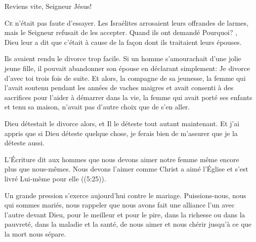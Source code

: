 Reviens vite, Seigneur Jésus! 

\dvrule








\lettrine{C}{e} n'était pas faute d'essayer. Les Israélites arrosaient
 leurs offrandes de larmes, mais le Seigneur refusait de les accepter.
 Quand ils ont demandé \Og Pourquoi? \Fg{}, Dieu leur a dit que c'était
 à cause de la fa\c{c}on dont ils traitaient leurs épouses. 

Ils avaient rendu le divorce trop facile. Si un homme s'amourachait
 d'une jolie jeune fille, il pouvait abandonner son épouse en déclarant
 simplement:  \Og Je divorce d'avec toi \Fg{}
 trois fois de suite. Et alors, la compagne de sa jeunesse,
 la femme qui l'avait soutenu pendant les années de vaches maigres
 et avait consenti à des sacrifices pour l'aider à démarrer dans la vie,
 la femme qui avait porté ses enfants et tenu sa maison,
 n'avait pas d'autre choix que de s'en aller. 


Dieu détestait le divorce alors, et Il le déteste tout autant maintenant.
 Et j'ai appris que si Dieu déteste quelque chose,
 je ferais bien de m'assurer que je la déteste aussi. 

L'Écriture dit aux hommes que nous devons aimer notre femme même encore plus
 que nous-mêmes. Nous devons l'aimer comme \Og Christ a aimé l'Église
 et s'est livré Lui-même pour elle \Fg{} ((5:25)). 

Un grande pression s'exerce aujourd'hui contre le mariage.
 Puissions-nous, nous qui sommes mariés, nous rappeler que nous avons fait
 une alliance l'un avec l'autre devant Dieu, \Og pour le meilleur
 et pour le pire, dans la richesse ou dans la pauvreté, dans la maladie
 et la santé, de nous aimer et nous chérir
 jusqu'à ce que la mort nous sépare. \Fg{}


